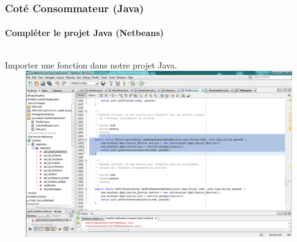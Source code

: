 \begin{frame}
\frametitle{Coté Consommateur (Java)}
\framesubtitle{Compléter le projet Java (Netbeans)}
\transsplithorizontalin[duration=1]
\begin{columns}
\begin{column}{16cm}
 \begin{alertblock}{Importer une fonction dans notre projet Java.}
 \includegraphics[width=16cm,height=7.2cm]{images/clientCaptures/etape9_importer_procedure.png}
  \end{alertblock}
\end{column}
\end{columns}
\end{frame}

